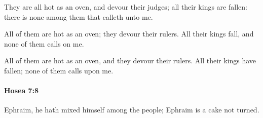 			\begin{versebox}
					\item[BHS] 
					\item[LXX] 
					\item[ASV] They are all hot as an oven, and devour their judges; all their kings are fallen: there is none among them that calleth unto me.
					\item[NIV] All of them are hot as an oven; they devour their rulers. All their kings fall, and none of them calls on me.
					\item[NRSV] All of them are hot as an oven, and they devour their rulers. All their kings have fallen; none of them calls upon me.
			\end{versebox}

		\paragraph{Hosea 7:8} %
			\label{HOSEA-7-8}

			Ephraim, he hath mixed himself among the people; Ephraim is a cake not turned.

